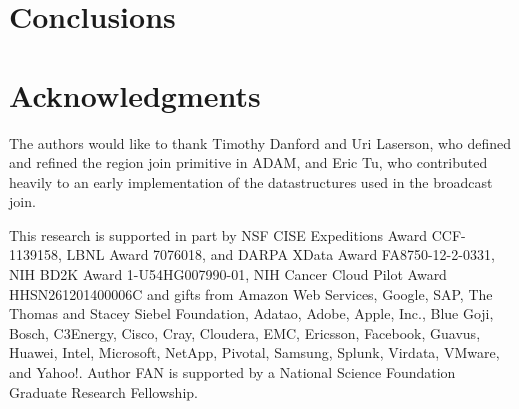 \documentclass{vldb}
\begin{document}
\section{Conclusions}
\label{sec:conclusions}

\balance

\section{Acknowledgments}

The authors would like to thank Timothy Danford and Uri Laserson, who defined
and refined the region join primitive in \textsc{ADAM}, and Eric Tu, who
contributed heavily to an early implementation of the datastructures used in
the broadcast join.

This research is supported in part by NSF CISE Expeditions Award CCF-1139158,
LBNL Award 7076018, and DARPA XData Award FA8750-12-2-0331, NIH BD2K Award
1-U54HG007990-01, NIH Cancer Cloud Pilot Award \linebreak HHSN261201400006C and gifts
from Amazon Web Services, Google, SAP,  The Thomas and Stacey Siebel
Foundation, Adatao, Adobe, Apple, Inc., Blue Goji, Bosch, C3Energy, Cisco,
Cray, Cloudera, EMC, Ericsson, Facebook, Guavus, Huawei, Intel, Microsoft,
NetApp, Pivotal, Samsung, Splunk, Virdata, VMware, and Yahoo!. Author FAN is
supported by a National Science Foundation Graduate Research Fellowship.



\end{document}
